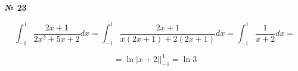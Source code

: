 \documentclass{article}
\begin{document}
\textbf{№ 23} 

\begingroup

\Large

$$ \int_{-1}^{1} \frac{2x+1}{2x^2+5x+2} dx 
= \int_{-1}^{1} \frac{2x+1}{x(2x+1) + 2(2x+1)} dx
= \int_{-1}^{1} \frac{1}{x+2} dx
= $$

$$ = \ln{\left| x+2 \right|} \bigg\vert_{-1}^{1}
= \ln{3} $$

\endgroup
\end{document}
